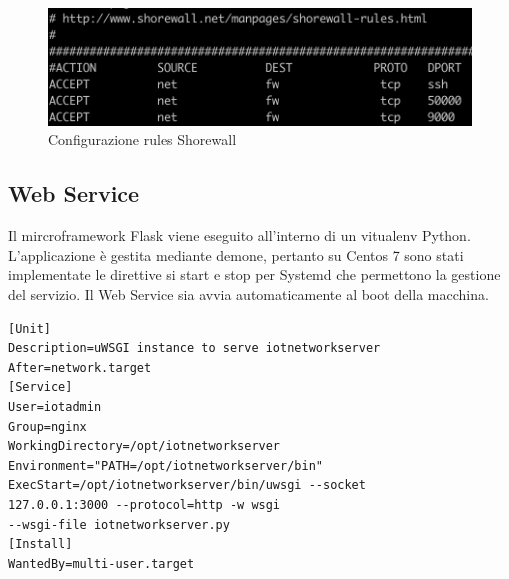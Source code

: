 \documentclass[12pt,a4paper,openright,twoside]{report}
\begin{document}
\begin{figure}[h]                      
\begin{center} 
\includegraphics[width=\textwidth]{shorewall.png}
\caption[Configurazione rules Shorewall]{Configurazione rules Shorewall}\label{fig:prima}
\end{center}
\end{figure}

\subsection{Web Service}
Il mircroframework Flask viene eseguito all'interno di un vitualenv Python. L'applicazione \`e gestita mediante demone, pertanto su Centos 7 sono stati implementate le direttive si start e stop per Systemd che permettono la gestione del servizio. Il Web Service sia avvia automaticamente al boot della macchina. 
\begin{lstlisting}
[Unit]
Description=uWSGI instance to serve iotnetworkserver
After=network.target
[Service]
User=iotadmin
Group=nginx
WorkingDirectory=/opt/iotnetworkserver
Environment="PATH=/opt/iotnetworkserver/bin"
ExecStart=/opt/iotnetworkserver/bin/uwsgi --socket 
127.0.0.1:3000 --protocol=http -w wsgi  
--wsgi-file iotnetworkserver.py
[Install]
WantedBy=multi-user.target
\end{lstlisting}
\end{document}
